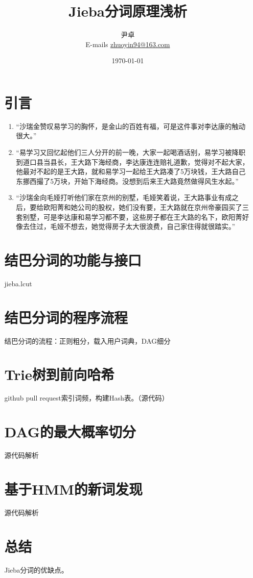 \documentclass[UTF8, 12pt]{ctexart}
\begin{document}
	
	\title{\heiti \Huge{Jieba分词原理浅析}}
	\author{\kaishu 尹卓 \\ E-mails \href{mailto:zhuoyin94@163.com}{zhuoyin94@163.com}}
	\date{\today}
	\maketitle
	
	\tableofcontents
	\newpage
	\section{引言}
	
	
	\begin{enumerate}
		\item “沙瑞金赞叹易学习的胸怀，是金山的百姓有福，可是这件事对李达康的触动很大。”
		\item “易学习又回忆起他们三人分开的前一晚，大家一起喝酒话别，易学习被降职到道口县当县长，王大路下海经商，李达康连连赔礼道歉，觉得对不起大家，他最对不起的是王大路，就和易学习一起给王大路凑了5万块钱，王大路自己东挪西撮了5万块，开始下海经商。没想到后来王大路竟然做得风生水起。”
		\item “沙瑞金向毛娅打听他们家在京州的别墅，毛娅笑着说，王大路事业有成之后，要给欧阳菁和她公司的股权，她们没有要，王大路就在京州帝豪园买了三套别墅，可是李达康和易学习都不要，这些房子都在王大路的名下，欧阳菁好像去住过，毛娅不想去，她觉得房子太大很浪费，自己家住得就很踏实。”
	\end{enumerate}
	
	\section{结巴分词的功能与接口}
	jieba.lcut
	
	\section{结巴分词的程序流程}
	结巴分词的流程：正则粗分，载入用户词典，DAG细分
	
	\section{Trie树到前向哈希}
	github pull request索引词频，构建Hash表。（源代码）
	
	\section{DAG的最大概率切分}
	源代码解析
	
	\section{基于HMM的新词发现}
	源代码解析
	
	\section{总结}
	Jieba分词的优缺点。
	
	
\end{document}
